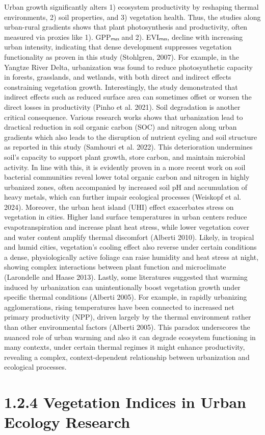 Urban growth significantly alters 1) ecosystem productivity by reshaping thermal environments, 2) soil properties, and 3) vegetation health. Thus, the studies along urban-rural gradients shows that plant photosynthesis and productivity, often measured via proxies like 1). GPPₘₐₓ and 2). EVIₘₐₓ, decline with increasing urban intensity, indicating that dense development suppresses vegetation functionality as proven in this study (Stohlgren, 2007). For example, in the Yangtze River Delta, urbanization was found to reduce photosynthetic capacity in forests, grasslands, and wetlands, with both direct and indirect effects constraining vegetation growth. Interestingly, the study demonstrated that indirect effects such as reduced surface area can sometimes offset or worsen the direct losses in productivity (Pinho et al. 2021).
Soil degradation is another critical consequence. Various research works shows that urbanization lead to dractical reduction in soil organic carbon (SOC) and nitrogen along urban gradients which also leads to the disruption of nutrient cycling and soil structure as reported in this study (Samhouri et al. 2022). This deterioration undermines soil's capacity to support plant growth, store carbon, and maintain microbial activity. In line with this, it is evidently proven in a more recent work on soil bacterial communities reveal lower total organic carbon and nitrogen in highly urbanized zones, often accompanied by increased soil pH and accumulation of heavy metals, which can further impair ecological processes (Weiskopf et al. 2024).
Moreover, the urban heat island (UHI) effect exacerbates stress on vegetation in cities. Higher land surface temperatures in urban centers reduce evapotranspiration and increase plant heat stress, while lower vegetation cover and water content amplify thermal discomfort (Alberti 2010). Likely, in tropical and humid cities, vegetation's cooling effect also reverse under certain conditions a dense, physiologically active foliage can raise humidity and heat stress at night, showing complex interactions between plant function and microclimate (Larondelle and Haase 2013).
Lastly, some literatures suggested that warming induced by urbanization can unintentionally boost vegetation growth under specific thermal conditions (Alberti 2005). For example, in rapidly urbanizing agglomerations, rising temperatures have been connected to increased net primary productivity (NPP), driven largely by the thermal environment rather than other environmental factors (Alberti 2005). This paradox underscores the nuanced role of urban warming and also it can degrade ecosystem functioning in many contexts, under certain thermal regimes it might enhance productivity, revealing a complex, context-dependent relationship between urbanization and ecological processes.
\hypertarget{vegetation-indices-in-urban-ecology-research}{%
\section{\texorpdfstring{\textbf{1.2.4 Vegetation Indices in Urban Ecology Research}}{1.2.4 Vegetation Indices in Urban Ecology Research}}\label{vegetation-indices-in-urban-ecology-research}}

